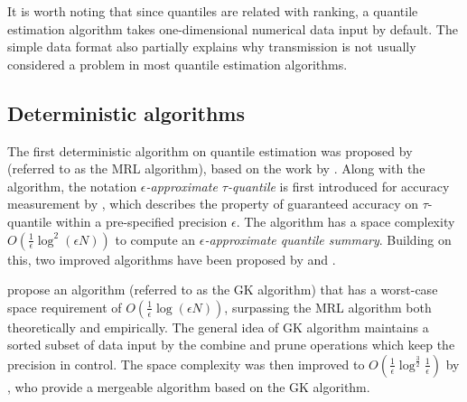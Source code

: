 It is worth noting that since quantiles are related with ranking, a quantile estimation algorithm takes one-dimensional numerical data input by default. The simple data format also partially explains why transmission is not usually considered a problem in most quantile estimation algorithms.
\subsection{Deterministic algorithms}
\label{deterministic}
The first deterministic algorithm on quantile estimation was proposed by \citeauthor{mankuApproximateMediansOther1998}\cite{mankuApproximateMediansOther1998} (referred to as the MRL algorithm), based on the work by \citeauthor{munroSelectionSortingLimited1980}\cite{munroSelectionSortingLimited1980}. Along with the algorithm, the notation \textit{$\epsilon$-approximate $\tau$-quantile} is first introduced for accuracy measurement by \citeauthor{mankuApproximateMediansOther1998}, which describes the property of guaranteed accuracy on $\tau$-quantile within a pre-specified precision $\epsilon$. The algorithm has a space complexity $O(\frac{1}{\epsilon}\log^2 (\epsilon N))$ to compute an \textit{$\epsilon$-approximate quantile summary}. Building on this, two improved algorithms have been proposed by \citeauthor{greenwaldQuantilesEquidepthHistograms2016a}\cite{greenwaldQuantilesEquidepthHistograms2016a} and \citeauthor{shrivastavaMediansNewAggregation2004b}\cite{shrivastavaMediansNewAggregation2004b}.

\citeauthor{greenwaldQuantilesEquidepthHistograms2016a}\cite{greenwaldQuantilesEquidepthHistograms2016a} propose an algorithm (referred to as the GK algorithm) that has a worst-case space requirement of $O(\frac{1}{\epsilon}\log(\epsilon N))$, surpassing the MRL algorithm both theoretically and empirically. The general idea of GK algorithm maintains a sorted subset of data input by the combine and prune operations which keep the precision in control. The space complexity was then improved to 
$O(\frac{1}{\epsilon}\log^{\frac{3}{2}}\frac{1}{\epsilon})$ by \citeauthor{agarwalMergeableSummaries2013}\cite{agarwalMergeableSummaries2013}, who provide a mergeable algorithm based on the GK algorithm.

